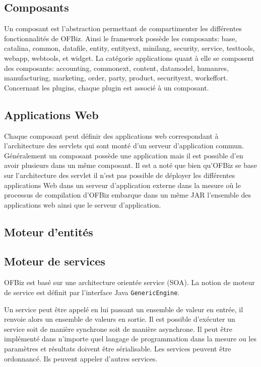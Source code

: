 \documentclass[a4paper, 11pt]{report}
\begin{document}
\subsection{Composants}

Un composant est l'abstraction permettant de compartimenter les
différentes fonctionnalités de OFBiz.  Ainsi le framework possède les
composants: base, catalina, common, datafile, entity, entityext,
minilang, security, service, testtools, webapp, webtools, et widget.
La catégorie applications quant à elle se composent des composants:
accounting, commonext, content, datamodel, humanres, manufacturing,
marketing, order, party, product, securityext, workeffort.  Concernant
les plugins, chaque plugin est associé à un composant.

\subsection{Applications Web}

Chaque composant peut définir des applications web correspondant à
l'architecture des servlets qui sont monté d'un serveur d'application
commun. Généralement un composant possède une application mais il est
possible d'en avoir plusieurs dans un même composant.  Il est a noté
que bien qu'OFBiz se base sur l'architecture des servlet il n'est pas
possible de déployer les différentes applications Web dans un serveur
d'application externe dans la mesure où le processus de compilation
d'OFBiz embarque dans un même JAR l'ensemble des applications web
ainsi que le serveur d'application.

\subsection{Moteur d'entités}
\subsection{Moteur de services}

OFBiz est basé sur une architecture orientée service (SOA).  La notion
de moteur de service est définit par l'interface Java
\verb=GenericEngine=.

Un service peut être appelé en lui passant un ensemble de valeur en
entrée, il renvoie alors un ensemble de valeurs en sortie.  Il est
possible d'exécuter un service soit de manière synchrone soit de
manière asynchrone.  Il peut être implémenté dans n'importe quel
langage de programmation dans la mesure ou les paramètres et résultats
doivent être sérialisable.  Les services peuvent être ordonnancé.  Ils
peuvent appeler d'autres services.
\end{document}
